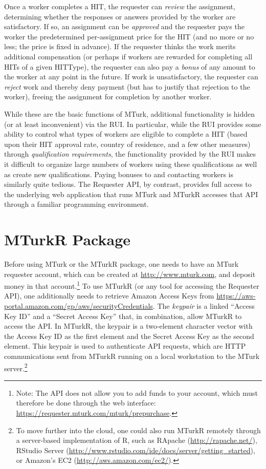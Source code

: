 \documentclass[11pt]{article}
\begin{document}
Once a worker completes a HIT, the requester can \emph{review} the assignment, determining whether the responses or answers provided by the worker are satisfactory. If so, an assignment can be \emph{approved} and the requester pays the worker the predetermined per-assignment price for the HIT (and no more or no less; the price is fixed in advance). If the requester thinks the work merits additional compensation (or perhaps if workers are rewarded for completing all HITs of a given HITType), the requester can also pay a \emph{bonus} of any amount to the worker at any point in the future. If work is unsatisfactory, the requester can \emph{reject} work and thereby deny payment (but has to justify that rejection to the worker), freeing the assignment for completion by another worker.

While these are the basic functions of MTurk, additional functionality is hidden (or at least inconvenient) via the RUI. In particular, while the RUI provides some ability to control what types of workers are eligible to complete a HIT (based upon their HIT approval rate, country of residence, and a few other measures) through \emph{qualification requirements}, the functionality provided by the RUI makes it difficult to organize large numbers of workers using these qualifications as well as create new qualifications. Paying bonuses to and contacting workers is similarly quite tedious. The Requester API, by contrast, provides full access to the underlying web application that runs MTurk and MTurkR accesses that API through a familiar programming environment.

\section{MTurkR Package}
Before using MTurk or the MTurkR package, one needs to have an MTurk requester account, which can be created at \url{http://www.mturk.com}, and deposit money in that account.\footnote{Note: The API does not allow you to add funds to your account, which must therefore be done through the web interface: \url{https://requester.mturk.com/mturk/prepurchase}.} To use MTurkR (or any tool for accessing the Requester API), one additionally needs to retrieve Amazon Access Keys from \url{https://aws-portal.amazon.com/gp/aws/securityCredentials}. The \emph{keypair} is a linked ``Access Key ID'' and a ``Secret Access Key'' that, in combination, allow MTurkR to access the API. In MTurkR, the keypair is a two-element character vector with the Access Key ID as the first element and the Secret Access Key as the second element. This keypair is used to authenticate API requests, which are HTTP communications sent from MTurkR running on a local workstation to the MTurk server.\footnote{To move further into the cloud, one could also run MTurkR remotely through a server-based implementation of R, such as RApache (\url{http://rapache.net/}), RStudio Server (\url{http://www.rstudio.com/ide/docs/server/getting_started}), or Amazon's EC2 (\url{http://aws.amazon.com/ec2/}).}
\end{document}
